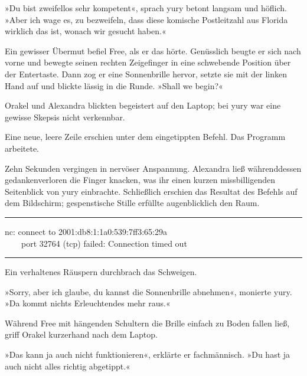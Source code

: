 »Du bist zweifellos sehr kompetent«, sprach yury betont langsam und höflich. »Aber ich wage es, zu bezweifeln, dass diese komische Postleitzahl aus Florida wirklich das ist, wonach wir gesucht haben.«

Ein gewisser Übermut befiel Free, als er das hörte. Genüsslich beugte er sich nach vorne und bewegte seinen rechten Zeigefinger in eine schwebende Position über der Entertaste. Dann zog er eine Sonnenbrille hervor, setzte sie mit der linken Hand auf und blickte lässig in die Runde. »Shall we begin?«

Orakel und Alexandra blickten begeistert auf den Laptop; bei yury war eine gewisse Skepsis nicht verkennbar.


Eine neue, leere Zeile erschien unter dem eingetippten Befehl. Das Programm arbeitete.

Zehn Sekunden vergingen in nervöser Anspannung. Alexandra ließ währenddessen gedankenverloren die Finger knacken, was ihr einen kurzen missbilligenden Seitenblick von yury einbrachte. Schließlich erschien das Resultat des Befehls auf dem Bildschirm; gespenstische Stille erfüllte augenblicklich den Raum.

\noindent \parbox{\textwidth}{ \vspace{3ex} \hrule \vspace{3ex}

    \begin{footnotesize}
    \begin{ttfamily}

\noindent nc: connect to 2001:db8:1:1a0:539:7ff3:65:29a\\
\noindent ~~~~port 32764 (tcp) failed: Connection timed out

    \end{ttfamily}
    \end{footnotesize}

\vspace{3ex} \hrule \vspace{3ex} }

Ein verhaltenes Räuspern durchbrach das Schweigen.

»Sorry, aber ich glaube, du kannst die Sonnenbrille abnehmen«, monierte yury. »Da kommt nichts Erleuchtendes mehr raus.«

Während Free mit hängenden Schultern die Brille einfach zu Boden fallen ließ, griff Orakel kurzerhand nach dem Laptop.

»Das kann ja auch nicht funktionieren«, erklärte er fachmännisch. »Du hast ja auch nicht alles richtig abgetippt.«

